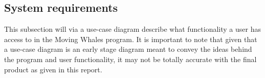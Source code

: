 \subsection{System requirements}

This subsection will via a use-case diagram describe what functionality a 
user has access to in the Moving Whales program. It is important to note that 
given that a use-case diagram is an early stage diagram meant to convey the 
ideas behind the program and user functionality, it may not be totally 
accurate with the final product as given in this report.


\clearpage

